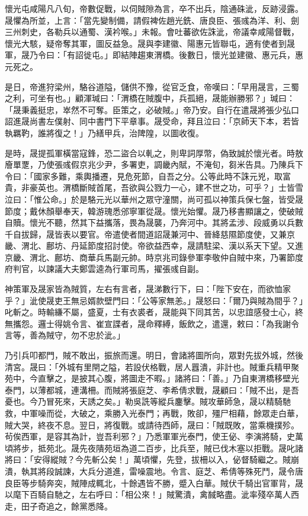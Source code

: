 \begin{pinyinscope}
 懷光屯咸陽凡八旬，帝數促戰，以伺賊隙為言，卒不出兵，陰通硃泚，反跡浸露。晟懼為所並，上言：「當先變制備，請假裨佐趙光銑、唐良臣、張彧為洋、利、劍三州刺史，各勒兵以通蜀、漢衿喉。」未報。會吐蕃欲佐誅泚，帝議幸咸陽督戰，懷光大駭，疑帝奪其軍，圖反益急。晟與李建徽、陽惠元皆聯屯，適有使者到晟軍，晟乃令曰：「有詔徙屯。」即結陣趨東渭橋。後數日，懷光並建徽、惠元兵，惠元死之。



 是日，帝進狩梁州，駱谷道隘，儲供不豫，從官乏食，帝嘆曰：「早用晟言，三蜀之利，可坐有也。」顧渾瑊曰：「渭橋在賊腹中，兵孤絕，晟能辦勝邪？」瑊曰：「晟秉義挺忠，崒然不可奪。臣策之，必破賊。」帝乃安。自行在遣晟將張少弘口詔進晟尚書左僕射、同中書門下平章事。晟受命，拜且泣曰：「京師天下本，若皆執羈靮，誰將復之！」乃繕甲兵，治陴隍，以圖收復。



 是時，晟提孤軍橫當寇鋒，恐二盜合以軋之，則卑詞厚幣，偽致誠於懷光者。時敖廥單覂，乃使張彧假京兆少尹，多署吏，調畿內賦，不淹旬，芻米告具。乃陳兵下令曰：「國家多難，乘輿播遷，見危死節，自吾之分。公等此時不誅元兇，取富貴，非豪英也。渭橋斷賊首尾，吾欲與公戮力一心，建不世之功，可乎？」士皆雪泣曰：「惟公命。」於是駱元光以華州之眾守潼關，尚可孤以神策兵保七盤，皆受晟節度；戴休顏舉奉天，韓游瑰悉邠寧軍從晟。懷光始懼。晟乃移書顯讓之，使破賊自贖。懷光不聽，然其下益攜落，畏為晟襲，乃奔河中。其將孟涉、段威勇以兵數千自拔歸，晟皆表以要官。帝遣使者間道詔晟兼河中、晉絳慈隰節度使，又兼京畿、渭北、鄜坊、丹延節度招討使。帝欲益西幸，晟請駐梁、漢以系天下望。又進京畿、渭北、鄜坊、商華兵馬副元帥。時京兆司錄參軍李敬仲自賊中來，乃署節度府判官，以諫議大夫鄭雲逵為行軍司馬，擢張彧自副。



 神策軍及晟家皆為賊質，左右有言者，晟涕數行下，曰：「陛下安在，而欲恤家乎？」泚使晟吏王無忌婿款壁門曰：「公等家無恙。」晟怒曰：「爾乃與賊為間乎？」叱斬之。時輸縑不屬，盛夏，士有衣裘者，晟能與下同其苦，以忠誼感發士心，終無攜怨。邏士得姚令言、崔宣諜者，晟命釋縛，飯飲之，遣還，敕曰：「為我謝令言等，善為賊守，勿不忠於泚。」



 乃引兵叩都門，賊不敢出，振旅而還。明日，會諸將圖所向，眾對先拔外城，然後清宮。晟曰：「外城有里閈之隘，若設伏格戰，居人囂潰，非計也。賊重兵精甲聚苑中，今直擊之，是披其心腹，將圖走不暇。」諸將曰：「善。」乃自東渭橋移壁光泰門，以薄都城，連溝柵。而賊將張庭芝、李希倩求戰，晟顧曰：「賊不出，是吾憂也。今乃冒死來，天誘之矣。」勒吳詵等縱兵鏖擊。賊攻華師急，晟以精騎馳救，中軍噪而從，大破之，乘勝入光泰門；再戰，敗卻，殭尸相藉，餘眾走白華，賊大哭，終夜不息。翌日，將復戰。或請待西師，晟曰：「賊既敗，當乘機撲殄。茍俟西軍，是容其為計，豈吾利邪？」乃悉軍軍光泰門，使王佖、李演將騎，史萬頃將步，抵苑北。晟先夜隤苑垣為道二百步，比兵至，賊已伐木塞以拒戰。晟叱諸將曰：「安得縱賊？今先斬公矣！」萬頃懼，先登，拔柵以入，佖督騎繼之。賊崩潰，執其將段誠諫，大兵分道進，雷噪震地。令言、庭芝、希倩等殊死鬥，晟令唐良臣等步騎奔突，賊陣成輒北，十餘遇皆不勝，蹙入白華。賊伏千騎出官軍背，晟以麾下百騎自馳之，左右呼曰：「相公來！」賊驚潰，禽馘略盡。泚率殘卒萬人西走，田子奇追之，餘黨悉降。




\end{pinyinscope}
